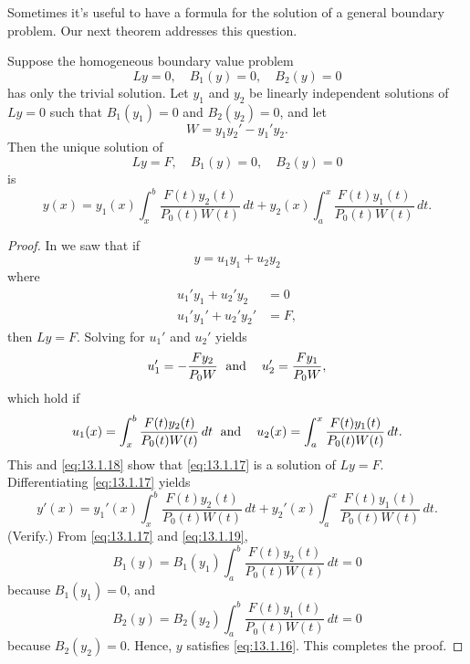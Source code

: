 Sometimes  it's useful to have a formula for the solution of a general
boundary problem. Our next theorem addresses this question.

\begin{theorem}\label{thmtype:13.1.3}
Suppose the homogeneous boundary value problem
\begin{equation} \label{eq:13.1.15}
Ly=0,\quad B_{1}(y)=0,\quad B_{2}(y)=0
\end{equation}
has only the trivial solution. Let $y_{1}$ and $y_{2}$ be linearly
independent solutions   of $Ly=0$ such that $B_{1}(y_{1})=0$ and
$B_{2}(y_{2})=0$, and let
\[
W=y_{1}y_{2}'-y_{1}'y_{2}.
\]
Then the unique solution of
\begin{equation} \label{eq:13.1.16}
Ly=F,\quad B_{1}(y)=0,\quad B_{2}(y)=0
\end{equation}
is
\begin{equation} \label{eq:13.1.17}
y(x)= y_{1}(x)\int_{x}^{b}\frac{F(t)y_{2}(t)}{P_{0}(t)W(t)}\,dt+
y_{2}(x)\int_{a}^{x}\frac{F(t)y_{1}(t)}{P_{0}(t)W(t)}\,dt.
\end{equation}
\end{theorem}

\begin{proof} In   we saw that if
\begin{equation} \label{eq:13.1.18}
y=u_{1}y_{1}+u_{2}y_{2}
\end{equation}
where
\begin{align*}
u_{1}'y_{1}+u_{2}'y_{2}&=0\\
u_{1}'y_{1}'+u_{2}'y_{2}'&=F,
\end{align*}
then  $Ly=F$. Solving for $u_{1}'$ and $u_{2}'$ yields
\[
u_{1}'=-\frac{Fy_{2}}{P_{0}W}\text{\;    and\; \;  }
u_{2}'=\frac{Fy_{1}}{P_{0}W},
\]
which hold if
\[
u_{1}(x)=\int_{x}^{b}\frac{F(t)y_{2}(t)}{P_{0}(t)W(t)}\,dt
\text{\;    and\; \;  }
u_{2}(x)=\int_{a}^{x}\frac{F(t)y_{1}(t)}{P_{0}(t)W(t)}\,dt.
\]
This and \eqref{eq:13.1.18} show that \eqref{eq:13.1.17} is a solution of $Ly=F$.
Differentiating \eqref{eq:13.1.17}  yields
\begin{equation} \label{eq:13.1.19}
y'(x)=y_{1}'(x)\int_{x}^{b}\frac{F(t)y_{2}(t)}{P_{0}(t)W(t)}\,dt+
y_{2}'(x)\int_{a}^{x}\frac{F(t)y_{1}(t)}{P_{0}(t)W(t)}\,dt.
\end{equation}
(Verify.) From \eqref{eq:13.1.17} and \eqref{eq:13.1.19},
\[
B_{1}(y)=B_{1}(y_{1})\int_{a}^{b}\frac{F(t)y_{2}(t)}{P_{0}(t)W(t)}\,dt=0
\]
because $B_{1}(y_{1})=0$, and
\[
B_{2}(y)=B_{2}(y_{2})\int_{a}^{b}\frac{F(t)y_{1}(t)}{P_{0}(t)W(t)}\,dt=0
\]
because $B_{2}(y_{2})=0$. Hence, $y$  satisfies \eqref{eq:13.1.16}.
This completes the proof.
\end{proof}

